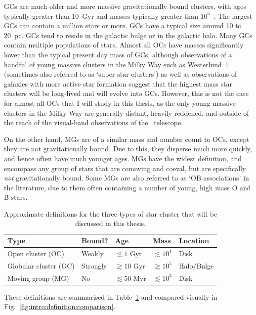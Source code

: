 GCs are much older and more massive gravitationally bound clusters, with ages typically greater than 10~Gyr and masses typically greater than $10^5$~\MSun. The largest GCs can contain a million stars or more. GCs have a typical size around 10 to 20~pc. GCs tend to reside in the galactic bulge or in the galactic halo. Many GCs contain multiple populations of stars. Almost all OCs have masses significantly lower than the typical present day mass of GCs, although observations of a handful of young massive clusters in the Milky Way such as Westerlund~1 (sometimes also referred to as `super star clusters') as well as observations of galaxies with more active star formation suggest that the highest mass star clusters will be long-lived and will evolve into GCs. However, this is not the case for almost all OCs that I will study in this thesis, as the only young massive clusters in the Milky Way are generally distant, heavily reddened, and outside of the reach of the visual-band observations of the \gaia\ telescope.

On the other hand, MGs are of a similar mass and number count to OCs, except they are not gravitationally bound. Due to this, they disperse much more quickly, and hence often have much younger ages. MGs have the widest definition, and encompass any group of stars that are comoving and coeval, but are specifically \emph{not} gravitationally bound. Some MGs are also referred to as `OB associations' in the literature, due to them often containing a number of young, high mass O and B stars. 

\begin{table}[tb]
	\begin{tabularx}{\textwidth}{l | X | X | X | X}
		\hline\hline
		Type & Bound? & Age & Mass & Location \\
		\hline
		Open cluster (OC)   & Weakly & $\lesssim 1$ Gyr & $\lesssim 10^4$ \MSun & Disk \\
		Globular cluster (GC)   & Strongly & $\gtrsim 10$ Gyr & $\gtrsim 10^5$ \MSun & Halo/Bulge \\
		Moving group (MG)   & No & $\lesssim 50$ Myr & $\lesssim 10^3$ \MSun & Disk\\
		\hline
	\end{tabularx}
	\caption{Approximate definitions for the three types of star cluster that will be discussed in this thesis.\label{tab:intro:definition:definition}}
\end{table}

These definitions are summarised in Table~\ref{tab:intro:definition:definition} and compared visually in Fig.~\ref{fig:intro:definition:comparison}.





